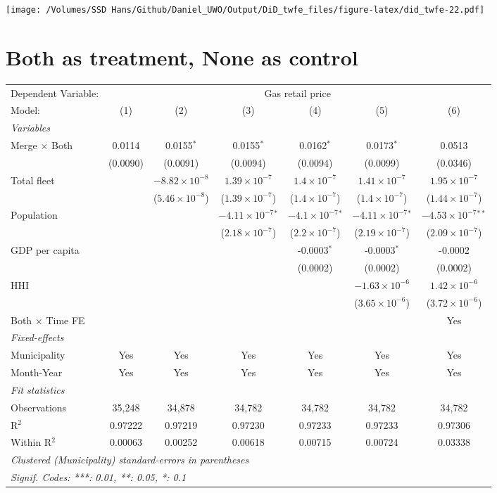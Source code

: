 \documentclass[
]{article}
\begin{document}
\texttt{[image: /Volumes/SSD Hans/Github/Daniel\_UWO/Output/DiD\_twfe\_files/figure-latex/did\_twfe-22.pdf]}

\hypertarget{both-as-treatment-none-as-control}{%
\section{Both as treatment, None as
control}\label{both-as-treatment-none-as-control}}

\begin{tabular}{lcccccc}
\tabularnewline\midrule\midrule
Dependent Variable:&\multicolumn{6}{c}{Gas retail price}\\
Model:&(1) & (2) & (3) & (4) & (5) & (6)\\
\midrule \emph{Variables}&   &   &   &   &   &  \\
Merge $\times $ Both & 0.0114 & 0.0155$^{*}$ & 0.0155$^{*}$ & 0.0162$^{*}$ & 0.0173$^{*}$ & 0.0513\\
  &(0.0090) & (0.0091) & (0.0094) & (0.0094) & (0.0099) & (0.0346)\\
Total fleet &    & $-8.82\times 10^{-8}$ & $1.39\times 10^{-7}$ & $1.4\times 10^{-7}$ & $1.41\times 10^{-7}$ & $1.95\times 10^{-7}$\\
  &   & ($5.46\times 10^{-8}$) & ($1.39\times 10^{-7}$) & ($1.4\times 10^{-7}$) & ($1.4\times 10^{-7}$) & ($1.44\times 10^{-7}$)\\
Population &    &    & $-4.11\times 10^{-7}$$^{*}$ & $-4.1\times 10^{-7}$$^{*}$ & $-4.11\times 10^{-7}$$^{*}$ & $-4.53\times 10^{-7}$$^{**}$\\
  &   &    & ($2.18\times 10^{-7}$) & ($2.2\times 10^{-7}$) & ($2.19\times 10^{-7}$) & ($2.09\times 10^{-7}$)\\
GDP per capita &    &    &    & -0.0003$^{*}$ & -0.0003$^{*}$ & -0.0002\\
  &   &    &    & (0.0002) & (0.0002) & (0.0002)\\
HHI &    &    &    &    & $-1.63\times 10^{-6}$ & $1.42\times 10^{-6}$\\
  &   &    &    &    & ($3.65\times 10^{-6}$) & ($3.72\times 10^{-6}$)\\
Both $\times$ Time FE &  &  &  &  &  & Yes\\
\midrule \emph{Fixed-effects}&   &   &   &   &   &  \\
Municipality & Yes & Yes & Yes & Yes & Yes & Yes\\
Month-Year & Yes & Yes & Yes & Yes & Yes & Yes\\
\midrule \emph{Fit statistics}&  & & & & & \\
Observations & 35,248&34,878&34,782&34,782&34,782&34,782\\
R$^2$ & 0.97222&0.97219&0.97230&0.97233&0.97233&0.97306\\
Within R$^2$ & 0.00063&0.00252&0.00618&0.00715&0.00724&0.03338\\
\midrule\midrule\multicolumn{7}{l}{\emph{Clustered (Municipality) standard-errors in parentheses}}\\
\multicolumn{7}{l}{\emph{Signif. Codes: ***: 0.01, **: 0.05, *: 0.1}}\\
\end{tabular}
\end{document}
